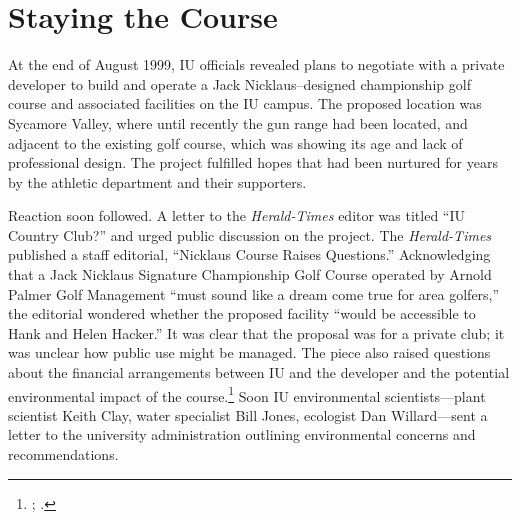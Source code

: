 \documentclass[
  american,
  letterpaper,
]{scrreprt}
\begin{document}
\section{Staying the Course}\label{staying-the-course}

At the end of August 1999, IU officials revealed plans to negotiate with
a private developer to build and operate a Jack Nicklaus--designed
championship golf course and associated facilities on the IU campus. The
proposed location was Sycamore Valley, where until recently the gun
range had been located, and adjacent to the existing golf course, which
was showing its age and lack of professional design. The project
fulfilled hopes that had been nurtured for years by the athletic
department and their supporters.

Reaction soon followed. A letter to the \emph{Herald-Times} editor was
titled ``IU Country Club?'' and urged public discussion on the project.
The \emph{Herald-Times} published a staff editorial, ``Nicklaus Course
Raises Questions.'' Acknowledging that a Jack Nicklaus Signature
Championship Golf Course operated by Arnold Palmer Golf Management
``must sound like a dream come true for area golfers,'' the editorial
wondered whether the proposed facility ``would be accessible to Hank and
Helen Hacker.'' It was clear that the proposal was for a private club;
it was unclear how public use might be managed. The piece also raised
questions about the financial arrangements between IU and the developer
and the potential environmental impact of the course.\footnote{; .} Soon IU environmental scientists---plant
scientist Keith Clay, water specialist Bill Jones, ecologist Dan
Willard---sent a letter to the university administration outlining
environmental concerns and recommendations.
\end{document}
